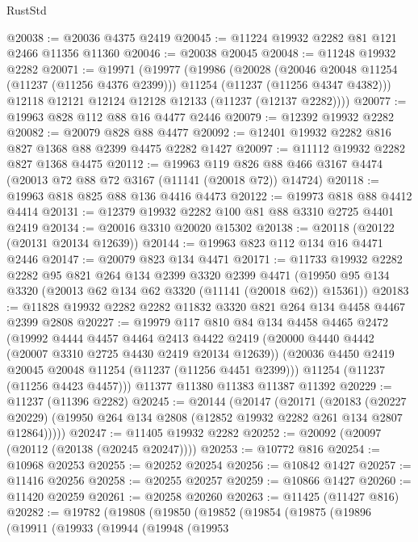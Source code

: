 \begin{lexlean}{RustStd}
\begin{coremodule}
@20038 := @20036 @4375 @2419
@20045 := @11224 @19932 @2282 @81 @121 @2466 @11356 @11360
@20046 := @20038 @20045
@20048 := @11248 @19932 @2282
@20071 := @19971
    (@19977
      (@19986
        (@20028
          (@20046 @20048 @11254 (@11237 (@11256 @4376 @2399)))
          @11254
          (@11237 (@11256 @4347 @4382)))
        @12118
        @12121
        @12124
        @12128
        @12133
        (@11237 (@12137 @2282))))
@20077 := @19963 @828 @112 @88 @16 @4477 @2446
@20079 := @12392 @19932 @2282
@20082 := @20079 @828 @88 @4477
@20092 := @12401 @19932 @2282 @816 @827 @1368 @88 @2399 @4475 @2282 @1427
@20097 := @11112 @19932 @2282 @827 @1368 @4475
@20112 := @19963
    @119
    @826
    @88
    @466
    @3167
    @4474
    (@20013 @72 @88 @72 @3167 (@11141 (@20018 @72)) @14724)
@20118 := @19963 @818 @825 @88 @136 @4416 @4473
@20122 := @19973 @818 @88 @4412 @4414
@20131 := @12379 @19932 @2282 @100 @81 @88 @3310 @2725 @4401 @2419
@20134 := @20016 @3310 @20020 @15302
@20138 := @20118 (@20122 (@20131 @20134 @12639))
@20144 := @19963 @823 @112 @134 @16 @4471 @2446
@20147 := @20079 @823 @134 @4471
@20171 := @11733
    @19932
    @2282
    @2282
    @95
    @821
    @264
    @134
    @2399
    @3320
    @2399
    @4471
    (@19950 @95 @134 @3320 (@20013 @62 @134 @62 @3320 (@11141 (@20018 @62)) @15361))
@20183 := @11828 @19932 @2282 @2282 @11832 @3320 @821 @264 @134 @4458 @4467 @2399 @2808
@20227 := @19979
    @117
    @810
    @84
    @134
    @4458
    @4465
    @2472
    (@19992
      @4444
      @4457
      @4464
      @2413
      @4422
      @2419
      (@20000 @4440 @4442 (@20007 @3310 @2725 @4430 @2419 @20134 @12639))
      (@20036 @4450 @2419 @20045 @20048 @11254 (@11237 (@11256 @4451 @2399)))
      @11254
      (@11237 (@11256 @4423 @4457)))
    @11377
    @11380
    @11383
    @11387
    @11392
@20229 := @11237 (@11396 @2282)
@20245 := @20144
    (@20147
      (@20171
        (@20183
          (@20227 @20229)
          (@19950 @264 @134 @2808 (@12852 @19932 @2282 @261 @134 @2807 @12864)))))
@20247 := @11405 @19932 @2282
@20252 := @20092 (@20097 (@20112 (@20138 (@20245 @20247))))
@20253 := @10772 @816
@20254 := @10968 @20253
@20255 := @20252 @20254
@20256 := @10842 @1427
@20257 := @11416 @20256
@20258 := @20255 @20257
@20259 := @10866 @1427
@20260 := @11420 @20259
@20261 := @20258 @20260
@20263 := @11425 (@11427 @816)
@20282 := @19782
    (@19808
      (@19850
        (@19852
          (@19854
            (@19875
              (@19896
                (@19911
                  (@19933
                    (@19944
                      (@19948
                        (@19953

\end{coremodule}
\end{lexlean}
